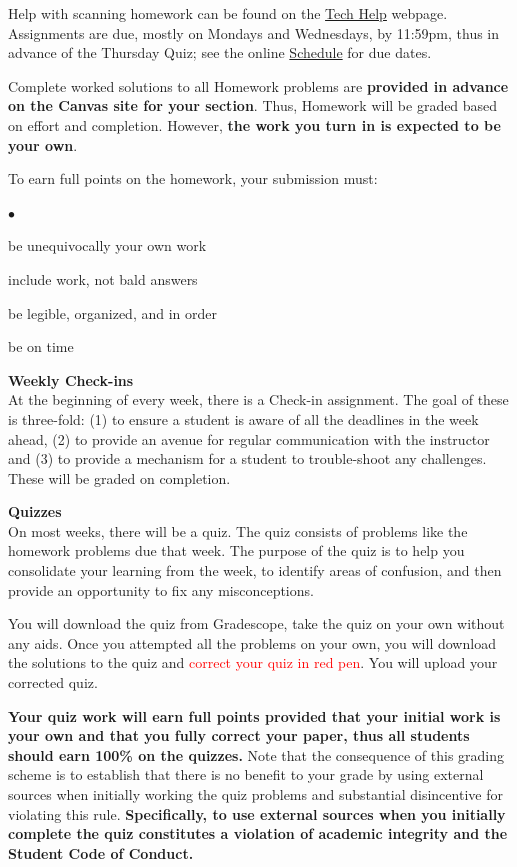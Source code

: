 \documentclass[12pt]{article}
\renewcommand{\emph}[1]{\textsf{\textbf{#1}}}
\newcommand{\localhead}[1]{\par\smallskip\textbf{#1} \smallskip\nobreak\\}%
\def\heading#1{\localhead{\large\emph{#1}}}
\newenvironment{clist}%
{\bgroup\parskip 0pt\begin{list}{$\bullet$}{\partopsep 4pt\topsep 0pt\itemsep -2pt}}%
{\end{list}\egroup}%
\begin{document}
Help with scanning homework can be found on the \href{https://uaf-math.github.io/calc2/techHelp.html}{Tech Help} webpage.  Assignments are due, mostly on Mondays and Wednesdays, by 11:59pm, thus in advance of the Thursday Quiz; see the online \href{https://uaf-math.github.io/calc2/assets/general/S26/inperson/schedule.pdf}{Schedule} for due dates.  

Complete worked solutions to all Homework problems are \textbf{provided in advance on the Canvas site for your section}.  Thus, Homework will be graded based on {effort} and {completion}.  However, \textbf{the work you turn in is expected to be your own}.  

To earn full points on the homework, your submission must:
\vskip -20pt\strut
\begin{clist}
\item be unequivocally your own work
\item include work, not bald answers
\item be legible, organized, and in order
\item be on time
\end{clist}

\heading{Weekly Check-ins}
At the beginning of every week, there is a Check-in assignment. The goal of these is three-fold: (1) to ensure a student is aware of all the deadlines in the week ahead, (2) to provide an avenue for regular communication with the instructor and (3) to provide a mechanism for a student to trouble-shoot any challenges. These will be graded on completion. 

\heading{Quizzes}
On most weeks, there will be a quiz.  The quiz consists of problems like the homework problems due that week. The purpose of the quiz is to help you consolidate your learning from the week, to identify areas of confusion, and then provide an opportunity to fix any misconceptions.  

You will download the quiz from Gradescope, take the quiz on your own without any aids. Once you attempted all the problems on your own, you will download the solutions to the quiz and \textcolor{red}{correct your quiz in red pen}. You will upload your corrected quiz. 

\textbf{Your quiz work will earn full points provided that your initial work is your own and that you fully correct your paper, thus all students should earn 100\% on the quizzes.} Note that the consequence of this grading scheme is to establish that there is no benefit to your grade by using external sources when initially working the quiz problems and substantial disincentive for violating this rule. \textbf{Specifically, to use external sources when you initially complete the quiz constitutes a violation of academic integrity and the Student Code of Conduct. }
\end{document}
